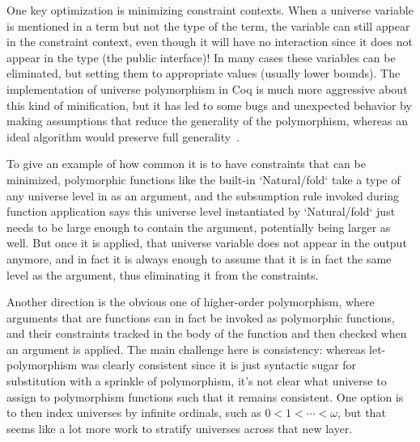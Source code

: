 \documentclass[11pt, twoside, reqno]{book}
\begin{document}
One key optimization is minimizing constraint contexts.
When a universe variable is mentioned in a term but not the type of the term, the variable can still appear in the constraint context, even though it will have no interaction since it does not appear in the type (the public interface)!
In many cases these variables can be eliminated, but setting them to appropriate values (usually lower bounds).
The implementation of universe polymorphism in Coq is much more aggressive about this kind of minification, but it has led to some bugs and unexpected behavior by making assumptions that reduce the generality of the polymorphism, whereas an ideal algorithm would preserve full generality~\cite{10.1007/978-3-319-08970-6_32}.

To give an example of how common it is to have constraints that can be minimized, polymorphic functions like the built-in \inHS`Natural/fold` take a type of any universe level in as an argument, and the subsumption rule invoked during function application says this universe level instantiated by \inHS`Natural/fold` just needs to be large enough to contain the argument, potentially being larger as well.
But once it is applied, that universe variable does not appear in the output anymore, and in fact it is always enough to assume that it is in fact the same level as the argument, thus eliminating it from the constraints.

Another direction is the obvious one of higher-order polymorphism, where arguments that are functions can in fact be invoked as polymorphic functions, and their constraints tracked in the body of the function and then checked when an argument is applied.
The main challenge here is consistency: whereas let-polymorphism was clearly consistent since it is just syntactic sugar for substitution with a sprinkle of polymorphism, it's not clear what universe to assign to polymorphism functions such that it remains consistent.
One option is to then index universes by infinite ordinals, such as \(0 < 1 < \cdots < \omega\), but that seems like a lot more work to stratify universes across that new layer.
\end{document}
